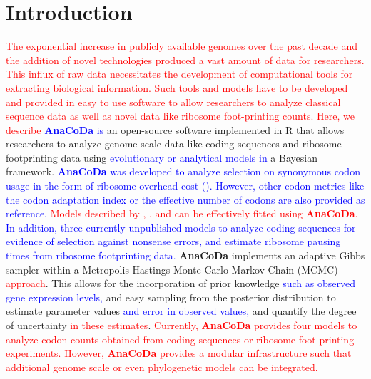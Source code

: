 \documentclass{bioinfo}
\newcommand{\package}{\textbf{AnaCoDa}\xspace} %
\begin{document}
\section*{Introduction}

\textcolor{red}
{
The exponential increase in publicly available genomes over the past decade and the addition of novel technologies produced a vast amount of data for researchers.  
This influx of raw data necessitates the development of computational tools for extracting biological information. 
Such tools and models have to be developed and provided in easy to use software to allow researchers to analyze classical sequence data as well as novel data like ribosome foot-printing counts.
Here, we describe
} %
\textcolor{blue}{\package is}  an open-source software implemented in R \citep{rcore} that allows researchers to analyze genome-scale data like coding sequences and ribosome footprinting data using \textcolor{blue}{evolutionary or analytical models in} a Bayesian framework. 
\textcolor{blue}
{
\package was developed to analyze selection on synonymous codon usage in the form of ribosome overhead cost (\citet{gilchrist2015,wallace2013,shah2011}).
However, other codon metrics like the codon adaptation index \citep{Sharp1987} or the effective number of codons \citep{Wright1990} are also provided as reference.
} 
\textcolor{red}{Models described by \citet{gilchrist2015}, \citet{wallace2013}, and \citet{shah2011} can be effectively fitted using \package.}
\textcolor{blue} 
{
In addition, three currently unpublished models to analyze coding sequences for evidence of selection against nonsense errors, and estimate ribosome pausing times from ribosome footprinting data.
} %
\package implements an adaptive Gibbs sampler within a Metropolis-Hastings Monte Carlo Markov Chain (MCMC) \textcolor{red}{approach}. 
This allows for the incorporation of prior knowledge \textcolor{blue}{such as observed gene expression levels,} and easy sampling from the posterior distribution to estimate parameter values \textcolor{blue}{and error in observed values,} and quantify the degree of uncertainty \textcolor{red}{in these estimates}.
\textcolor{red}
{
Currently, \package provides four models to analyze codon counts obtained from coding sequences or ribosome foot-printing experiments. 
However, \package provides a modular infrastructure such that additional genome scale or even phylogenetic models can be integrated.
} 
\end{document}
